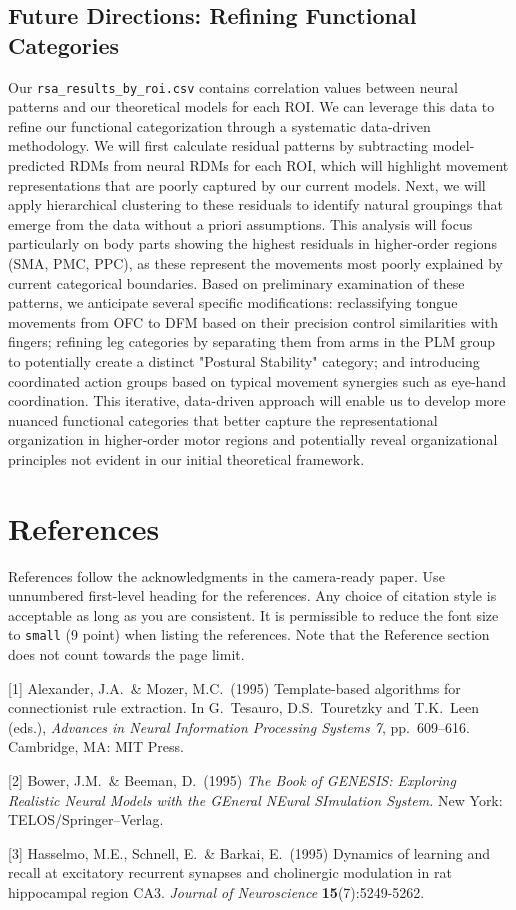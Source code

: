 \documentclass{article}
\begin{document}
\subsection{Future Directions: Refining Functional Categories}

Our \texttt{rsa\_results\_by\_roi.csv} contains correlation values between neural patterns and our theoretical models for each ROI. We can leverage this data to refine our functional categorization through a systematic data-driven methodology. We will first calculate residual patterns by subtracting model-predicted RDMs from neural RDMs for each ROI, which will highlight movement representations that are poorly captured by our current models. Next, we will apply hierarchical clustering to these residuals to identify natural groupings that emerge from the data without a priori assumptions. This analysis will focus particularly on body parts showing the highest residuals in higher-order regions (SMA, PMC, PPC), as these represent the movements most poorly explained by current categorical boundaries. Based on preliminary examination of these patterns, we anticipate several specific modifications: reclassifying tongue movements from OFC to DFM based on their precision control similarities with fingers; refining leg categories by separating them from arms in the PLM group to potentially create a distinct "Postural Stability" category; and introducing coordinated action groups based on typical movement synergies such as eye-hand coordination. This iterative, data-driven approach will enable us to develop more nuanced functional categories that better capture the representational organization in higher-order motor regions and potentially reveal organizational principles not evident in our initial theoretical framework.


\section*{References}


References follow the acknowledgments in the camera-ready paper. Use unnumbered first-level heading for
the references. Any choice of citation style is acceptable as long as you are
consistent. It is permissible to reduce the font size to \verb+small+ (9 point)
when listing the references.
Note that the Reference section does not count towards the page limit.
\medskip


{
\small


[1] Alexander, J.A.\ \& Mozer, M.C.\ (1995) Template-based algorithms for
connectionist rule extraction. In G.\ Tesauro, D.S.\ Touretzky and T.K.\ Leen
(eds.), {\it Advances in Neural Information Processing Systems 7},
pp.\ 609--616. Cambridge, MA: MIT Press.


[2] Bower, J.M.\ \& Beeman, D.\ (1995) {\it The Book of GENESIS: Exploring
  Realistic Neural Models with the GEneral NEural SImulation System.}  New York:
TELOS/Springer--Verlag.


[3] Hasselmo, M.E., Schnell, E.\ \& Barkai, E.\ (1995) Dynamics of learning and
recall at excitatory recurrent synapses and cholinergic modulation in rat
hippocampal region CA3. {\it Journal of Neuroscience} {\bf 15}(7):5249-5262.
}
\end{document}

